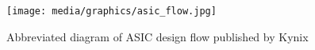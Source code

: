 
\begin{figure}[t]
    \centering
    \texttt{[image: media/graphics/asic\_flow.jpg]}
    \caption[
        Abbreviated diagram of ASIC design flow
    ]{
        Abbreviated diagram of ASIC design flow published by Kynix \cite{kynixDesignFlow}
    }
    \label{fig:asic_flow}
\end{figure}
